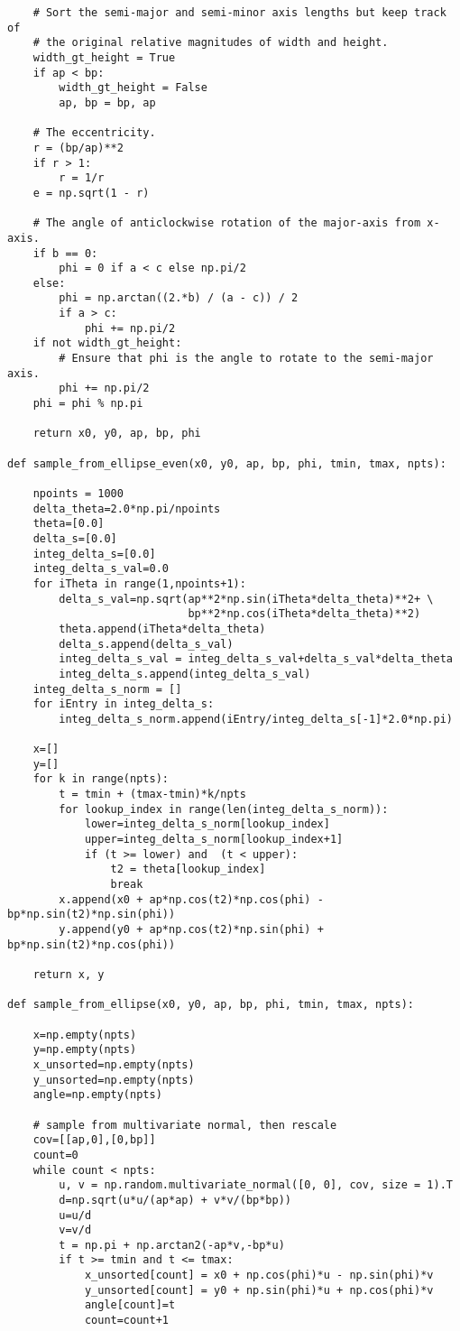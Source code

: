 \documentclass[oneside,10pt]{book}
\begin{document}
\begin{lstlisting}
    # Sort the semi-major and semi-minor axis lengths but keep track of
    # the original relative magnitudes of width and height.
    width_gt_height = True
    if ap < bp:
        width_gt_height = False
        ap, bp = bp, ap

    # The eccentricity.
    r = (bp/ap)**2
    if r > 1:
        r = 1/r
    e = np.sqrt(1 - r)

    # The angle of anticlockwise rotation of the major-axis from x-axis.
    if b == 0:
        phi = 0 if a < c else np.pi/2
    else:
        phi = np.arctan((2.*b) / (a - c)) / 2
        if a > c:
            phi += np.pi/2
    if not width_gt_height:
        # Ensure that phi is the angle to rotate to the semi-major axis.
        phi += np.pi/2
    phi = phi % np.pi

    return x0, y0, ap, bp, phi

def sample_from_ellipse_even(x0, y0, ap, bp, phi, tmin, tmax, npts):

    npoints = 1000
    delta_theta=2.0*np.pi/npoints
    theta=[0.0]
    delta_s=[0.0]
    integ_delta_s=[0.0]
    integ_delta_s_val=0.0
    for iTheta in range(1,npoints+1):
        delta_s_val=np.sqrt(ap**2*np.sin(iTheta*delta_theta)**2+ \
                            bp**2*np.cos(iTheta*delta_theta)**2)
        theta.append(iTheta*delta_theta)
        delta_s.append(delta_s_val)
        integ_delta_s_val = integ_delta_s_val+delta_s_val*delta_theta
        integ_delta_s.append(integ_delta_s_val)
    integ_delta_s_norm = []
    for iEntry in integ_delta_s:
        integ_delta_s_norm.append(iEntry/integ_delta_s[-1]*2.0*np.pi)    
    
    x=[]
    y=[] 
    for k in range(npts):
        t = tmin + (tmax-tmin)*k/npts
        for lookup_index in range(len(integ_delta_s_norm)):
            lower=integ_delta_s_norm[lookup_index]
            upper=integ_delta_s_norm[lookup_index+1]
            if (t >= lower) and  (t < upper):
                t2 = theta[lookup_index]
                break    
        x.append(x0 + ap*np.cos(t2)*np.cos(phi) - bp*np.sin(t2)*np.sin(phi))
        y.append(y0 + ap*np.cos(t2)*np.sin(phi) + bp*np.sin(t2)*np.cos(phi))

    return x, y

def sample_from_ellipse(x0, y0, ap, bp, phi, tmin, tmax, npts): 

    x=np.empty(npts)
    y=np.empty(npts)
    x_unsorted=np.empty(npts)
    y_unsorted=np.empty(npts)
    angle=np.empty(npts)

    # sample from multivariate normal, then rescale 
    cov=[[ap,0],[0,bp]]
    count=0
    while count < npts:
        u, v = np.random.multivariate_normal([0, 0], cov, size = 1).T
        d=np.sqrt(u*u/(ap*ap) + v*v/(bp*bp))
        u=u/d
        v=v/d
        t = np.pi + np.arctan2(-ap*v,-bp*u)   
        if t >= tmin and t <= tmax:
            x_unsorted[count] = x0 + np.cos(phi)*u - np.sin(phi)*v
            y_unsorted[count] = y0 + np.sin(phi)*u + np.cos(phi)*v
            angle[count]=t
            count=count+1


\end{lstlisting}
\end{document}
